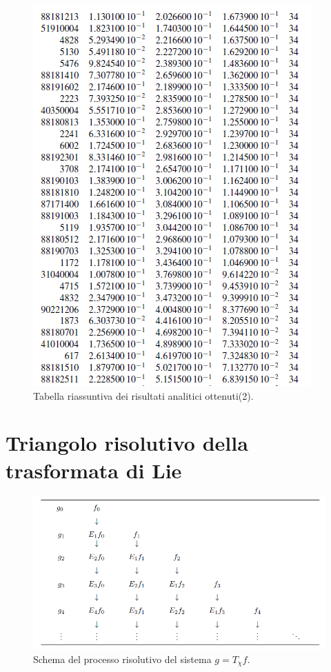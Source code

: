 \documentclass[a4paper,11pt,titlepage]{report}
\theoremstyle{definition}
\theoremstyle{plain}
\begin{document}
\begin{figure}[h]
	\label{Fig:Tabdef2}
	\centering
	\includegraphics[scale=0.8]{Tabdef2.png}
	\caption{Tabella riassuntiva dei risultati analitici ottenuti(2).}
\end{figure}






\appendix

\chapter{Triangolo risolutivo della trasformata di Lie}

\begin{figure}[h]
	\label{Fig:TriangLie}
	\centering
	\includegraphics[scale=0.8]{TriangoloLie.png}
	\caption{Schema del processo risolutivo del sistema $g=T_{\chi}f$.} 
\end{figure}
\end{document}
